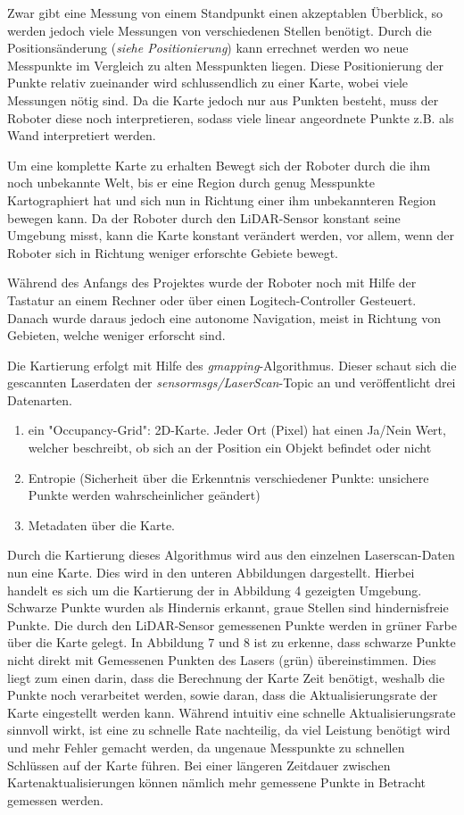 {{		Zwar gibt eine Messung von einem Standpunkt einen akzeptablen Überblick, so werden jedoch viele Messungen von verschiedenen Stellen benötigt. Durch die Positionsänderung (\textit{siehe Positionierung}) kann errechnet werden wo neue Messpunkte im Vergleich zu alten Messpunkten liegen. Diese Positionierung der Punkte relativ zueinander wird schlussendlich zu einer Karte, wobei viele Messungen nötig sind. Da die Karte jedoch nur aus Punkten besteht, muss der Roboter diese noch interpretieren, sodass viele linear angeordnete Punkte z.B. als Wand interpretiert werden.
		
		Um eine komplette Karte zu erhalten Bewegt sich der Roboter durch die ihm noch unbekannte Welt, bis er eine Region durch genug Messpunkte Kartographiert hat und sich nun in Richtung einer ihm unbekannteren Region bewegen kann. Da der Roboter durch den LiDAR-Sensor konstant seine Umgebung misst, kann die Karte konstant verändert werden, vor allem, wenn der Roboter sich in Richtung weniger erforschte Gebiete bewegt.
		
		Während des Anfangs des Projektes wurde der Roboter noch mit Hilfe der Tastatur an einem Rechner oder über einen Logitech-Controller Gesteuert. Danach wurde daraus jedoch eine autonome Navigation, meist in Richtung von Gebieten, welche weniger erforscht sind. 
		
		Die Kartierung erfolgt mit Hilfe des \textit{gmapping}-Algorithmus. Dieser schaut sich die gescannten Laserdaten der \textit{sensor\textunderscore msgs/LaserScan}-Topic an und veröffentlicht drei Datenarten.
		\begin{enumerate}
			\item ein "Occupancy-Grid": 2D-Karte. Jeder Ort (Pixel) hat einen Ja/Nein Wert, welcher beschreibt, ob sich an der Position ein Objekt befindet oder nicht
			\item Entropie (Sicherheit über die Erkenntnis verschiedener Punkte: unsichere Punkte werden wahrscheinlicher geändert)
			\item Metadaten über die Karte.
		\end{enumerate}
		
		Durch die Kartierung dieses Algorithmus wird aus den einzelnen Laserscan-Daten nun eine Karte. Dies wird in den unteren Abbildungen dargestellt. Hierbei handelt es sich um die Kartierung der in Abbildung 4 gezeigten Umgebung. Schwarze Punkte wurden als Hindernis erkannt, graue Stellen sind hindernisfreie Punkte. Die durch den LiDAR-Sensor gemessenen Punkte werden in grüner Farbe über die Karte gelegt. In Abbildung 7 und 8 ist zu erkenne, dass schwarze Punkte nicht direkt mit Gemessenen Punkten des Lasers (grün) übereinstimmen. Dies liegt zum einen darin, dass die Berechnung der Karte Zeit benötigt, weshalb die Punkte noch verarbeitet werden, sowie daran, dass die Aktualisierungsrate der Karte eingestellt werden kann. Während intuitiv eine schnelle Aktualisierungsrate sinnvoll wirkt, ist eine zu schnelle Rate nachteilig, da viel Leistung benötigt wird und mehr Fehler gemacht werden, da ungenaue Messpunkte zu schnellen Schlüssen auf der Karte führen. Bei einer längeren Zeitdauer zwischen Kartenaktualisierungen können nämlich mehr gemessene Punkte in Betracht gemessen werden.
		
}}
